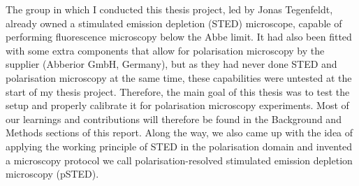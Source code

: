 The group in which I conducted this thesis project, led by Jonas Tegenfeldt, already owned a stimulated emission depletion (STED) microscope, capable of performing fluorescence microscopy below the Abbe limit. It had also been fitted with some extra components that allow for polarisation microscopy by the supplier (Abberior GmbH, Germany), but as they had never done STED and polarisation microscopy at the same time, these capabilities were untested at the start of my thesis project. Therefore, the main goal of this thesis was to test the setup and properly calibrate it for polarisation microscopy experiments. Most of our learnings and contributions will therefore be found in the Background and Methods sections of this report. Along the way, we also came up with the idea of applying the working principle of STED in the polarisation domain and invented a microscopy protocol we call polarisation-resolved stimulated emission depletion microscopy (pSTED).